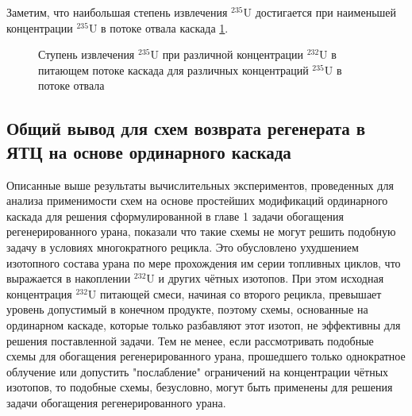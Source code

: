 Заметим, что наибольшая степень извлечения $^{235}$U достигается при наименьшей концентрации $^{235}$U в потоке отвала каскада \ref{3_12pl}.

\begin{figure}[ht]
  \caption{Ступень извлечения $^{235}$U при различной концентрации $^{232}$U в питающем потоке каскада для различных концентраций $^{235}$U в потоке отвала}\label{3_12pl}
\end{figure}



\subsection{Общий вывод для схем возврата регенерата в ЯТЦ на основе ординарного каскада}

Описанные выше результаты вычислительных экспериментов, проведенных для анализа применимости схем на основе простейших модификаций ординарного каскада для решения сформулированной в главе 1 задачи обогащения регенерированного урана, показали что такие схемы не могут решить подобную задачу в условиях  многократного рецикла. Это обусловлено ухудшением изотопного состава урана по мере прохождения им серии топливных циклов, что выражается в накоплении $^{232}$U и других чётных изотопов. При этом исходная концентрация $^{232}$U питающей смеси, начиная со второго рецикла, превышает уровень допустимый в конечном продукте, поэтому схемы, основанные на ординарном каскаде, которые только разбавляют этот изотоп, не эффективны для решения поставленной задачи. Тем не менее, если рассмотривать подобные схемы для обогащения регенерированного урана, прошедшего только однократное облучение или допустить "послабление" ограничений на концентрации чётных изотопов, то подобные схемы, безусловно, могут быть применены для решения задачи обогащения регенерированного урана.

